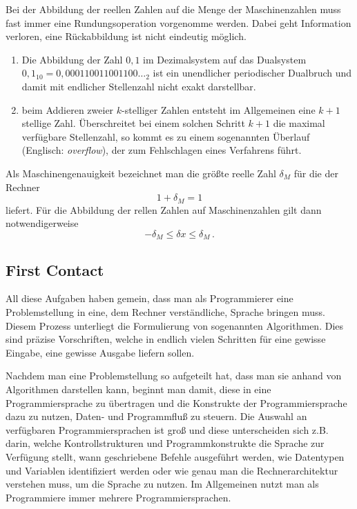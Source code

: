 Bei der Abbildung der reellen Zahlen auf die Menge der Maschinenzahlen
muss fast immer eine Rundungsoperation vorgenomme werden. Dabei geht
Information verloren, eine Rückabbildung ist nicht eindeutig möglich.

\begin{framed}
  \begin{enumerate}
  \item Die Abbildung der Zahl $0,1$ im Dezimalsystem auf das
    Dualsystem $0,1_{10} = 0,000110011001100\ldots_2$ ist ein unendlicher
    periodischer Dualbruch und damit mit endlicher Stellenzahl nicht
    exakt darstellbar.
  \item beim Addieren zweier $k$-stelliger Zahlen entsteht im
    Allgemeinen eine $k+1$ stellige Zahl. Überschreitet bei einem
    solchen Schritt $k+1$ die maximal verfügbare Stellenzahl, so kommt
    es zu einem sogenannten Überlauf (Englisch: \emph{overflow}), der
    zum Fehlschlagen eines Verfahrens führt.
  \end{enumerate}
\end{framed}

Als Maschinengenauigkeit bezeichnet man die größte reelle Zahl
$\delta_M$ für die der Rechner
\begin{equation}
1 + \delta_M = 1
\end{equation}
liefert. Für die Abbildung der rellen Zahlen auf Maschinenzahlen gilt
dann notwendigerweise
\begin{equation}
-\delta_M \leq \delta x\leq \delta_M\,.
\end{equation}

\subsection{First Contact}

\iflecturer
\begin{framed}
\end{framed}
\fi

All diese Aufgaben haben gemein, dass man als Programmierer eine Problemstellung in eine, dem Rechner verständliche, Sprache bringen muss.
Diesem Prozess unterliegt die Formulierung von sogenannten Algorithmen.
Dies sind präzise Vorschriften, welche in endlich vielen Schritten für eine gewisse Eingabe, eine gewisse Ausgabe liefern sollen.

Nachdem man eine Problemstellung so aufgeteilt hat, dass man sie anhand von Algorithmen darstellen kann, beginnt man damit, diese in eine Programmiersprache zu übertragen und die Konstrukte der Programmiersprache dazu zu nutzen, Daten- und Programmfluß zu steuern.
Die Auswahl an verfügbaren Programmiersprachen ist groß und diese unterscheiden sich z.B. darin, welche Kontrollstrukturen und Programmkonstrukte die Sprache zur Verfügung stellt, wann geschriebene Befehle ausgeführt werden, wie Datentypen und Variablen identifiziert werden oder wie genau man die Rechnerarchitektur verstehen muss, um die Sprache zu nutzen.
Im Allgemeinen nutzt man als Programmiere immer mehrere Programmiersprachen.

